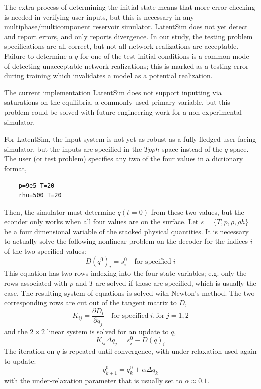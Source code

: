 \documentclass[]{article}
\begin{document}
The extra process of determining the initial state means that more error checking is needed
in verifying user inputs, but this is necessary in any
multiphase/multicomponent reservoir simulator. LatentSim does not yet
detect and report errors, and only reports divergence. In our study, the
testing problem specifications are all correct, but not all network
realizations are acceptable. Failure to determine a \(q\) for one of the
test initial conditions is a common mode of detecting unacceptable
network realizations; this is marked as a testing error during training
which invalidates a model as a potential realization.

The current implementation LatentSim does not support inputting via
saturations on the equilibria, a commonly used primary variable, but
this problem could be solved with future engineering work for a
non-experimental simulator.

For LatentSim, the input system is not yet as robust as a
fully-fledged user-facing simulator, but the inputs are specified in
the $T p \rho h$ space instead of the $q$ space.
The user (or test problem) specifies any two of the four values in a
dictionary format,
\begin{verbatim}
    p=9e5 T=20
    rho=500 T=20
\end{verbatim}
Then, the simulator must determine $q(t=0)$ from these two
values, but the econder only works when all four values are on the
surface. Let $s=\{T,p,\rho,\rho h\}$ be a four dimensional
variable of the stacked physical quantities. It is necessary to
actually solve the following nonlinear problem
on the decoder for the indices $i$ of the two specified values:
\begin{equation}
  D(q^0)_i = s^0_i \quad \text{for specified}\; i
\end{equation}
This equation has two rows indexing into the four state variables;
e.g. only the rows associated with $p$ and $T$ are solved if those are
specified, which is usually the case. The resulting system of
equations is solved with Newton's method. The two corresponding rows are cut out of
the tangent matrix to $D$,
\begin{equation}
K_{ij} = \frac{\partial D_i}{\partial q_j}  \quad \text{for
    specified}\; i, \text{for}\;j=1,2
\end{equation}
and the $2\times2$ linear system is solved for an update to $q$,
\begin{equation}
K_{ij}\Delta q_j = s^0_i-D(q)_i
\end{equation}
The iteration on $q$ is repeated until convergence, with under-relaxation used again to update:
 \begin{equation}
q^0_{k+1} =q^0_{k} + \alpha \Delta q_{k}
\end{equation}
with the under-relaxation parameter that is usually set to $\alpha \approx
0.1$.
\end{document}
